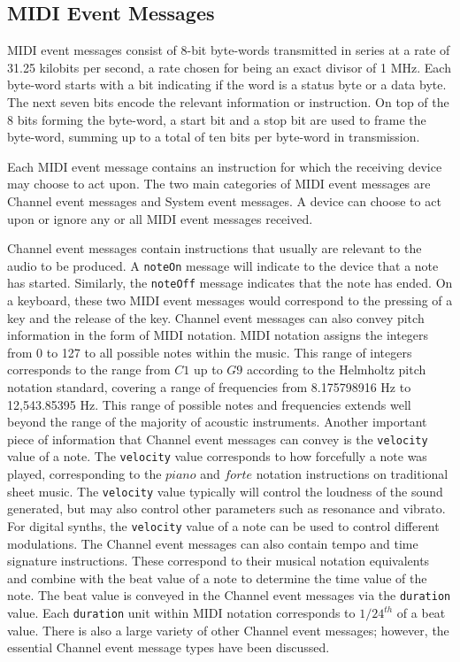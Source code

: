 \documentclass[a4paper,12pt]{report}
\begin{document}
\subsection{MIDI Event Messages}
\label{subsec:midieventmsg}

MIDI event messages consist of 8-bit byte-words transmitted in series at a rate of 31.25 kilobits per second, a rate chosen for being an exact divisor of 1 MHz. Each byte-word starts with a bit indicating if the word is a status byte or a data byte. The next seven bits encode the relevant information or instruction. On top of the 8 bits forming the byte-word, a start bit and a stop bit are used to frame the byte-word, summing up to a total of ten bits per byte-word in transmission.

Each MIDI event message contains an instruction for which the receiving device may choose to act upon. The two main categories of MIDI event messages are Channel event messages and System event messages. A device can choose to act upon or ignore any or all MIDI event messages received.

Channel event messages contain instructions that usually are relevant to the audio to be produced. A \texttt{noteOn} message will indicate to the device that a note has started. Similarly, the \texttt{noteOff} message indicates that the note has ended. On a keyboard, these two MIDI event messages would correspond to the pressing of a key and the release of the key. Channel event messages can also convey pitch information in the form of MIDI notation. MIDI notation assigns the integers from 0 to 127 to all possible notes within the music. This range of integers corresponds to the range from $C1$ up to $G9$ according to the Helmholtz pitch notation standard, covering a range of frequencies from 8.175798916 Hz to 12,543.85395 Hz. This range of possible notes and frequencies extends well beyond the range of the majority of acoustic instruments. Another important piece of information that Channel event messages can convey is the \texttt{velocity} value of a note. The \texttt{velocity} value corresponds to how forcefully a note was played, corresponding to the $piano$ and $forte$ notation instructions on traditional sheet music. The \texttt{velocity} value typically will control the loudness of the sound generated, but may also control other parameters such as resonance and vibrato. For digital synths, the \texttt{velocity} value of a note can be used to control different modulations. The Channel event messages can also contain tempo and time signature instructions. These correspond to their musical notation equivalents and combine with the beat value of a note to determine the time value of the note. The beat value is conveyed in the Channel event messages via the \texttt{duration} value. Each \texttt{duration} unit within MIDI notation corresponds to $1/24^{th}$ of a beat value. There is also a large variety of other Channel event messages; however, the essential Channel event message types have been discussed.
\end{document}
